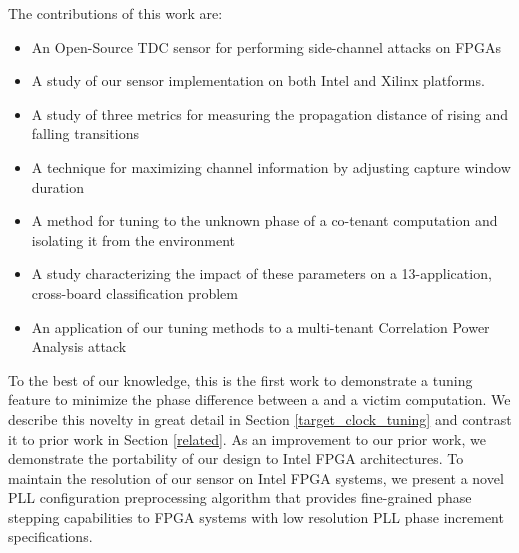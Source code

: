 




The contributions of this work are:
\begin{itemize}
    \item An Open-Source \name TDC sensor for performing side-channel attacks on FPGAs
    \item A study of our sensor implementation on both Intel and Xilinx platforms.
    \item A study of three metrics for measuring the propagation distance of rising and falling transitions
    \item A technique for maximizing channel information by adjusting capture window duration
    \item A method for tuning to the unknown phase of a co-tenant computation and isolating it from the environment
    \item A study characterizing the impact of these parameters on a 13-application, cross-board classification problem
    \item An application of our tuning methods to a multi-tenant Correlation Power Analysis attack
\end{itemize}

To the best of our knowledge, this is the first work to demonstrate a tuning feature to minimize the phase difference between a \sensor and a victim computation. We describe this novelty in great detail in Section \ref{target_clock_tuning} and contrast it to prior work in Section \ref{related}. As an improvement to our prior work, we demonstrate the portability of our \sensor design to Intel FPGA architectures. To maintain the resolution of our sensor on Intel FPGA systems, we present a novel PLL configuration preprocessing algorithm that provides fine-grained phase stepping capabilities to FPGA systems with low resolution PLL phase increment specifications.

